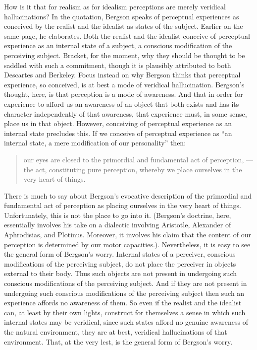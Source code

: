 \documentclass[12pt]{article}
\begin{document}
How is it that for realism as for idealism perceptions are merely veridical hallucinations? In the quotation, Bergson speaks of perceptual experiences as conceived by the realist and the idealist as states of the subject. Earlier on the same page, he elaborates. Both the realist and the idealist conceive of perceptual experience as an internal state of a subject, a conscious modification of the perceiving subject. Bracket, for the moment, why they should be thought to be saddled with such a commitment, though it is plausibly attributed to both Descartes and Berkeley. Focus instead on why Bergson thinks that perceptual experience, so conceived, is at best a mode of veridical hallucination. Bergson's thought, here, is that perception is a mode of awareness. And that in order for experience to afford us an awareness of an object that both exists and has its character independently of that awareness, that experience must, in some sense, place us in that object. However, conceiving of perceptual experience as an internal state precludes this. If we conceive of perceptual experience as ``an internal state, a mere modification of our personality'' then:
\begin{quote}
	our eyes are closed to the primordial and fundamental act of perception, ---the act, constituting pure perception, whereby we place ourselves in the very heart of things. \citep[73]{Bergson:1912pi}
\end{quote}
There is much to say about Bergson's evocative description of the primordial and fundamental act of perception as placing ourselves in the very heart of things. Unfortunately, this is not the place to go into it. (Bergson's doctrine, here, essentially involves his take on a dialectic involving Aristotle, Alexander of Aphrodisias, and Plotinus. Moreover, it involves his claim that the content of our perception is determined by our motor capacities.). Nevertheless, it is easy to see the general form of Bergson's worry. Internal states of a perceiver, conscious modifications of the perceiving subject, do not place the perceiver in objects external to their body. Thus such objects are not present in undergoing such conscious modifications of the perceiving subject. And if they are not present in undergoing such conscious modifications of the perceiving subject then such an experience affords no awareness of them. So even if the realist and the idealist can, at least by their own lights, construct for themselves a sense in which such internal states may be veridical, since such states afford no genuine awareness of the natural environment, they are at best, veridical hallucinations of that environment. That, at the very lest, is the general form of Bergson's worry.
\end{document}
